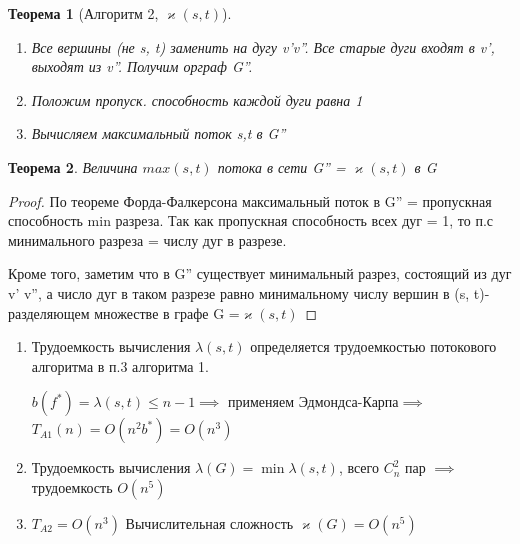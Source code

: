 \documentclass[a4paper]{article}
\newtheorem{theorem}{Теорема}[section]
\theoremstyle{definition}
\theoremstyle{remark}
\begin{document}
\begin{multicols*}{2}
\begin{theorem}[Алгоритм 2, $\varkappa(s, t)$]
\begin{enumerate}
            \item Все вершины (не s, t) заменить на дугу v'v''. Все старые дуги входят в v', выходят из v''. Получим орграф G''.
            \item Положим пропуск. способность каждой дуги равна 1 
            \item Вычисляем максимальный поток s,t в G''
        \end{enumerate}
    \end{theorem}
    \begin{theorem}
        Величина $max(s,t)$ потока в сети G'' = $\varkappa(s,t)$ в G
    \end{theorem}
    \begin{proof}
        По теореме Форда-Фалкерсона максимальный поток в G'' = пропускная способность min разреза. Так как пропускная способность всех дуг = 1, то п.с минимального разреза = числу дуг в разрезе.

        Кроме того, заметим что в G'' существует минимальный разрез, состоящий из дуг v' v'', а число дуг в таком разрезе равно минимальному числу вершин в (s, t)-разделяющем множестве в графе G =$\varkappa(s, t)$
    \end{proof}
    \begin{enumerate}
        \item Трудоемкость вычисления $\lambda(s, t)$ определяется трудоемкостью потокового алгоритма в п.3 алгоритма 1.

        $b(f^*) = \lambda(s, t) \leq n - 1\implies$ применяем Эдмондса-Карпа$\implies$
        $T_{A1}(n) = O(n^2b^*) = O(n^3)$
        \item 
        Трудоемкость вычисления $\lambda(G) = \min \lambda(s, t)$, всего $C^2_n$ пар $\implies$ трудоемкость $O(n^5)$
        \item     
        $T_{A2} = O(n^3)$
        Вычислительная сложность $\varkappa(G) = O(n^5)$
    \end{enumerate}
    

\end{multicols*}
\end{document}
